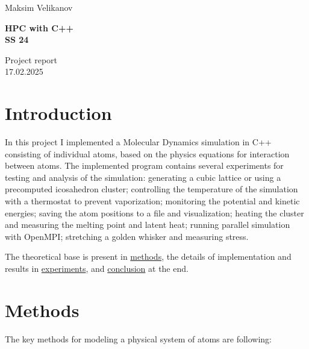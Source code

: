 \documentclass[12pt,a4paper]{article}
\title{}
\author{}
\begin{document}
\parbox{0.333\textwidth}{
	Maksim Velikanov \\[0mm]
}
\parbox{0.333\textwidth}{\vspace*{1mm}\begin{center}\large\bf%
		HPC with C++\\[0mm]
		SS 24\\[0mm]
\end{center}}
\parbox{0.333\textwidth}{
	\begin{flushright}
		Project report\\[0mm]
		17.02.2025\\[0mm]
	\end{flushright}
}
\par\vspace{-5mm}
\vspace*{2mm}
\raisebox{1.19cm}{%
	\textcolor{freiburg-gray}{\rule{\textwidth}{1.1mm}}}

\bigskip




\section{Introduction}

In this project I implemented a Molecular Dynamics simulation in C++ consisting of individual atoms, based on the physics equations for interaction between atoms. The implemented program contains several experiments for testing and analysis of the simulation: generating a cubic lattice or using a precomputed icosahedron cluster; controlling the temperature of the simulation with a thermostat to prevent vaporization; monitoring the potential and kinetic energies; saving the atom positions to a file and visualization; heating the cluster and measuring the melting point and latent heat; running parallel simulation with OpenMPI; stretching a golden whisker and measuring stress.

The theoretical base is present in \hyperref[methods]{methods}, the details of implementation and results in \hyperref[experiments]{experiments}, and \hyperref[conclusion]{conclusion} at the end.

\section{Methods}
\label{methods}

The key methods for modeling a physical system of atoms are following:
\end{document}
